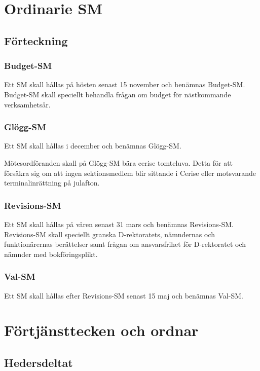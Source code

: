 \documentclass{dgovdoc}
\begin{document}
\section{Ordinarie SM}

\subsection{Förteckning}

\subsubsection{Budget-SM}

Ett SM skall hållas på hösten senast 15 november och benämnas Budget-SM.
Budget-SM skall speciellt behandla frågan om budget för nästkommande
verksamhetsår.

\subsubsection{Glögg-SM}

Ett SM skall hållas i december och benämnas Glögg-SM.

Mötesordföranden skall på Glögg-SM bära cerise tomteluva. Detta för att
försäkra sig om att ingen sektionsmedlem blir sittande i Cerise eller
motsvarande terminalinrättning på julafton.

\subsubsection{Revisions-SM}

Ett SM skall hållas på våren senast 31 mars och benämnas Revisions-SM.
Revisions-SM skall speciellt granska D-rektoratets, nämndernas och
funktionärernas berättelser samt frågan om ansvarsfrihet för D-rektoratet och
nämnder med bokföringsplikt.

\subsubsection{Val-SM}

Ett SM skall hållas efter Revisions-SM senast 15 maj och benämnas Val-SM.

\section{Förtjänsttecken och ordnar}

\subsection{Hedersdeltat}
\end{document}
